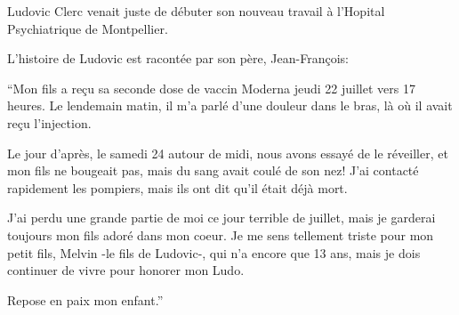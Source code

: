 Ludovic Clerc venait juste de débuter son nouveau travail à l'Hopital
Psychiatrique de Montpellier.

L'histoire de Ludovic est racontée par son père, Jean-François:

“Mon fils a reçu sa seconde dose de vaccin Moderna jeudi 22 juillet vers 17
heures. Le lendemain matin, il m'a parlé d'une douleur dans le bras, là où il
avait reçu l'injection.

Le jour d'après, le samedi 24 autour de midi, nous avons essayé de le réveiller,
et mon fils ne bougeait pas, mais du sang avait coulé de son nez! J'ai contacté
rapidement les pompiers, mais ils ont dit qu'il était déjà mort.

J'ai perdu une grande partie de moi ce jour terrible de juillet, mais je
garderai toujours mon fils adoré dans mon coeur. Je me sens tellement triste
pour mon petit fils, Melvin -le fils de Ludovic-, qui n'a encore que 13 ans,
mais je dois continuer de vivre pour honorer mon Ludo.

Repose en paix mon enfant.”


